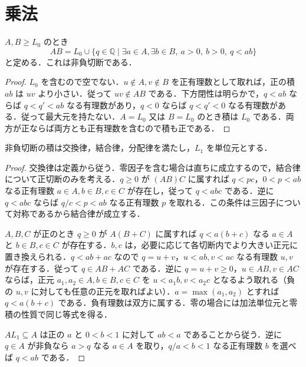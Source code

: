 \section{乗法}
\begin{defn}[非負切断の乗法]
$A,B\geq L_0$ のとき
\[
 AB=L_0\cup\{q\in\mathbb Q\mid \exists a\in A,\exists b\in B,\ a>0,\ b>0,\ q<ab\}
\]
と定める．これは非負切断である．
\end{defn}
\begin{proof}
$L_0$ を含むので空でない．$u\notin A,v\notin B$ を正有理数として取れば，正の積 $ab$ は $uv$ より小さい．従って $uv\notin AB$ である．下方閉性は明らかで，$q<ab$ ならば $q<q'<ab$ なる有理数があり，$q<0$ ならば $q<q'<0$ なる有理数がある．従って最大元を持たない．$A=L_0$ 又は $B=L_0$ のとき積は $L_0$ である．両方が正ならば両方とも正有理数を含むので積も正である．
\end{proof}
\begin{prop}[非負切断の乗法則]
非負切断の積は交換律，結合律，分配律を満たし，$L_1$ を単位元とする．
\end{prop}
\begin{proof}
交換律は定義から従う．零因子を含む場合は直ちに成立するので，結合律について正切断のみを考える．$q\geq0$ が $(AB)C$ に属すれば $q<pc$，$0<p<ab$ なる正有理数 $a\in A,b\in B,c\in C$ が存在し，従って $q<abc$ である．逆に $q<abc$ ならば $q/c<p<ab$ なる正有理数 $p$ を取れる．この条件は三因子について対称であるから結合律が成立する．

$A,B,C$ が正のとき $q\geq0$ が $A(B+C)$ に属すれば $q<a(b+c)$ なる $a\in A$ と $b\in B,c\in C$ が存在する．$b,c$ は，必要に応じて各切断内でより大きい正元に置き換えられる．$q<ab+ac$ なので $q=u+v$，$u<ab,v<ac$ なる有理数 $u,v$ が存在する．従って $q\in AB+AC$ である．逆に $q=u+v\geq0$，$u\in AB,v\in AC$ ならば，正元 $a_1,a_2\in A,b\in B,c\in C$ を $u<a_1b,v<a_2c$ となるよう取れる（負の $u,v$ に対しても任意の正元を取ればよい）．$a=\max(a_1,a_2)$ とすれば $q<a(b+c)$ である．負有理数は双方に属する．零の場合には加法単位元と零積の性質で同じ等式を得る．

$AL_1\subseteq A$ は正の $a$ と $0<b<1$ に対して $ab<a$ であることから従う．逆に $q\in A$ が非負なら $a>q$ なる $a\in A$ を取り，$q/a<b<1$ なる正有理数 $b$ を選べば $q<ab$ である．
\end{proof}
